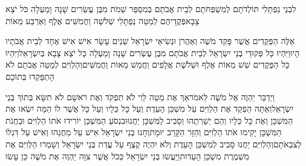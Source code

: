 \documentclass[../main/main.tex]{subfiles}
\begin{document}
\begin{multicols*}{\ncols}
לִבְנֵי\SubEnd{} נַפְתָּלִי תּוֹלְדֹתָם לְמִשְׁפְּחֹתָם לְבֵית אֲבֹתָם בְּמִסְפַּר שֵׁמֹת מִבֶּן עֶשְׂרִים שָׁנָה וָמַעְלָה כֹּל יֹצֵא צָבָא\PreVerseSpace{}פְּקֻדֵיהֶם לְמַטֵּה נַפְתָּלִי שְׁלֹשָׁה וַחֲמִשִּׁים אֶלֶף וְאַרְבַּע מֵאוֹת\OpenSection{}\par
{}אֵלֶּה הַפְּקֻדִים אֲשֶׁר פָּקַד מֹשֶׁה וְאַהֲרֹן וּנְשִׂיאֵי יִשְׂרָאֵל שְׁנֵים עָשָׂר אִישׁ אִישׁ אֶחָד לְבֵית אֲבֹתָיו הָיוּ\PreVerseSpace{}וַיִּהְיוּ כָּל פְּקוּדֵי בְנֵי יִשְׂרָאֵל לְבֵית אֲבֹתָם מִבֶּן עֶשְׂרִים שָׁנָה וָמַעְלָה כָּל יֹצֵא צָבָא בְּיִשְׂרָאֵל\PreVerseSpace{}וַיִּהְיוּ כָּל הַפְּקֻדִים שֵׁשׁ מֵאוֹת אֶלֶף וּשְׁלֹשֶׁת אֲלָפִים וַחֲמֵשׁ מֵאוֹת וַחֲמִשִּׁים\PreVerseSpace{}וְהַלְוִיִּם לְמַטֵּה אֲבֹתָם לֹא הָתְפָּקְדוּ בְּתוֹכָם\OpenSection{}\par
{}וַיְדַבֵּר יַהְוֶה אֶל מֹשֶׁה לֵּאמֹר\PreVerseSpace{}אַךְ אֶת מַטֵּה לֵוִי לֹא תִפְקֹד וְאֶת רֹאשָׁם לֹא תִשָּׂא בְּתוֹךְ בְּנֵי יִשְׂרָאֵל\PreVerseSpace{}וְאַתָּה הַפְקֵד אֶת הַלְוִיִּם עַל מִשְׁכַּן הָעֵדֻת וְעַל כָּל כֵּלָיו וְעַל כָּל אֲשֶׁר לוֹ הֵמָּה יִשְׂאוּ אֶת הַמִּשְׁכָּן וְאֶת כָּל כֵּלָיו וְהֵם יְשָׁרְתֻהוּ וְסָבִיב לַמִּשְׁכָּן יַחֲנוּ\PreVerseSpace{}וּבִנְסֹעַ הַמִּשְׁכָּן יוֹרִידוּ אֹתוֹ הַלְוִיִּם וּבַחֲנֹת הַמִּשְׁכָּן יָקִימוּ אֹתוֹ הַלְוִיִּם וְהַזָּר הַקָּרֵב יוּמָת\PreVerseSpace{}וְחָנוּ בְּנֵי יִשְׂרָאֵל אִישׁ עַל מַחֲנֵהוּ וְאִישׁ עַל דִּגְלוֹ לְצִבְאֹתָם\PreVerseSpace{}וְהַלְוִיִּם יַחֲנוּ סָבִיב לְמִשְׁכַּן הָעֵדֻת וְלֹא יִהְיֶה קֶצֶף עַל עֲדַת בְּנֵי יִשְׂרָאֵל וְשָׁמְרוּ הַלְוִיִּם אֶת מִשְׁמֶרֶת מִשְׁכַּן הָעֵדוּת\PreVerseSpace{}וַיַּעֲשׂוּ בְּנֵי יִשְׂרָאֵל כְּכֹל אֲשֶׁר צִוָּה יַהְוֶה אֶת מֹשֶׁה כֵּן עָשׂוּ\OpenSection{}\par

\end{multicols*}
\end{document}
